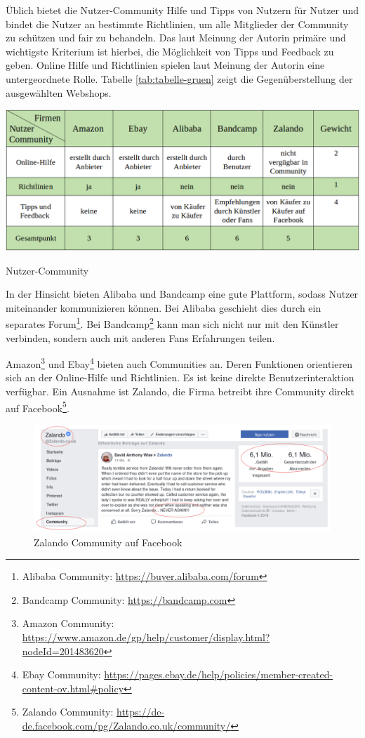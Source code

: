 Üblich bietet die Nutzer-Community Hilfe und Tipps von Nutzern für Nutzer und bindet die Nutzer an bestimmte Richtlinien, um alle Mitglieder der Community zu schützen und fair zu behandeln. Das laut Meinung der Autorin primäre und wichtigste Kriterium ist hierbei, die Möglichkeit von Tipps und Feedback zu geben. Online Hilfe und Richtlinien spielen laut Meinung der Autorin eine untergeordnete Rolle. Tabelle \vref{tab:tabelle-gruen} zeigt die Gegenüberstellung der ausgewählten Webshops.

\begin{table}[htbp]
	\centering
	\includegraphics[width=1\textwidth]{bilder/tabelle-gruen.png}
	\caption{Nutzer-Community}
	\label{tab:tabelle-gruen}
\end{table}

In der Hinsicht bieten Alibaba und Bandcamp eine gute Plattform, sodass Nutzer miteinander kommunizieren können. Bei Alibaba geschieht dies durch ein separates Forum\footnote{Alibaba Community: \url{https://buyer.alibaba.com/forum}}. Bei Bandcamp\footnote{ Bandcamp Community: \url{https://bandcamp.com}} kann man sich nicht nur mit den Künstler verbinden, sondern auch mit anderen Fans Erfahrungen teilen.

Amazon\footnote{Amazon Community: \url{https://www.amazon.de/gp/help/customer/display.html?nodeId=201483620}} und Ebay\footnote{Ebay Community: \url{https://pages.ebay.de/help/policies/member-created-content-ov.html\#policy}} bieten auch Communities an. Deren Funktionen orientieren sich an der Online-Hilfe und Richtlinien. Es ist keine direkte Benutzerinteraktion verfügbar. Ein Ausnahme ist Zalando, die Firma betreibt ihre Community direkt auf Facebook\footnote{Zalando Community: \url{https://de-de.facebook.com/pg/Zalando.co.uk/community/}}.

\begin{figure}[htbp]
	\centering
	\includegraphics[width=1\textwidth]{bilder/zalando-community.png}
	\caption{Zalando Community auf Facebook}
	\label{fig:zalando-community}
\end{figure}

